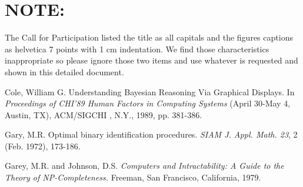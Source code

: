 \section{NOTE:}
The Call for Participation listed the title as 
all capitals and the figures captions as helvetica 7 points with 1 cm 
indentation.  We find those characteristics inappropriate so please 
ignore those two items and use whatever is requested and shown in this 
detailed document. 



\begin{thebibliography}{1}

Cole, William G. Understanding Bayesian
Reasoning Via Graphical Displays.  In {\it Proceedings of CHI'89 Human 
Factors in Computing Systems \/}(April 30-May 4, Austin, TX), 
ACM/SIGCHI , N.Y., 1989, pp. 381-386.

 Gary, M.R.  Optimal binary identification 
procedures.  {\it SIAM J. Appl. Math. 23\/}, 2 (Feb. 1972), 173-186.

 Garey, M.R. and Johnson, D.S. {\it 
Computers and Intractability:  A Guide to the Theory 
of NP-Completeness.\/}  Freeman, San Francisco, California, 1979.

\end{thebibliography}




